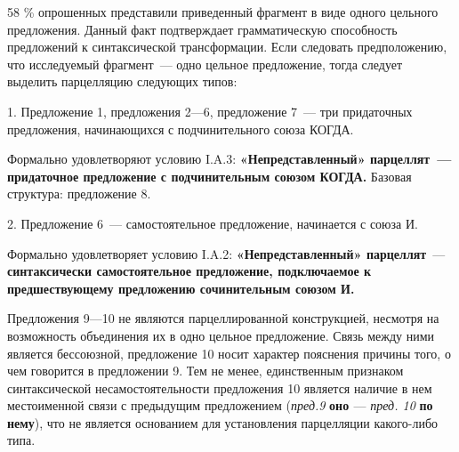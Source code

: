 \documentclass{kursa4}
\begin{document}
    \textcolor[rgb]{0.2,0.2,0.2}{}\textcolor[rgb]{0.2,0.2,0.2}{58 \%
    опрошенных представили приведенный фрагмент в виде
    }\textcolor[rgb]{0.2,0.2,0.2}{одного цельного
    предложения}\textcolor[rgb]{0.2,0.2,0.2}{. Данный факт подтверждает
    грамматическую способность предложений к синтаксической трансформации.
    }\textcolor[rgb]{0.2,0.2,0.2}{Если следовать предположению, что
    исследуемый фрагмент~--- одно цельное предложение, тогда следует выделить
    парцелляцию следующих типов: }

    \textcolor[rgb]{0.2,0.2,0.2}{1. Предложение 1, предложения 2—6,
    предложение 7~--- три придаточных предложения, начинающихся с
    подчинительного союза КОГДА.}

    \textcolor[rgb]{0.2,0.2,0.2}{Формально удовлетворяют условию I.A.3:
    }\textbf{\textcolor[rgb]{0.2,0.2,0.2}{«Непредставленный» парцеллят~---
    придаточное предложение с подчинительным союзом
    КОГДА.}}\textcolor[rgb]{0.2,0.2,0.2}{ Базовая структура: предложение
    8.}

    \textcolor[rgb]{0.2,0.2,0.2}{2. Предложение
    }\textcolor[rgb]{0.2,0.2,0.2}{6}\textcolor[rgb]{0.2,0.2,0.2}{~---
    }\textcolor[rgb]{0.2,0.2,0.2}{самостоятельное предложение, начинается с
    союза }\textcolor[rgb]{0.2,0.2,0.2}{И.}

    \textcolor[rgb]{0.2,0.2,0.2}{Ф}\textcolor[rgb]{0.2,0.2,0.2}{ормально
    удовлетворяет условию I.A.2:
    }\textbf{\textcolor[rgb]{0.2,0.2,0.2}{«Непредставленный»
    парцеллят}}\textcolor[rgb]{0.2,0.2,0.2}{~---
    }\textbf{\textcolor[rgb]{0.2,0.2,0.2}{синтаксически самостоятельное
    предложение, подключаемое к предшествующему предложению сочинительным
    союзом И.}}

    \textcolor[rgb]{0.2,0.2,0.2}{Предложения 9—10 не являются
    парцеллированной конструкцией, несмотря на возможность объединения их в
    одно цельное предложение. Связь между ними является бессоюзной,
    предложение 10 носит характер пояснения причины того, о чем говорится в
    предложении 9. Тем не менее, единственным признаком синтаксической
    несамостоятельности предложения 10 является наличие в нем местоименной
    связи с предыдущим предложением
    (}\textit{\textcolor[rgb]{0.2,0.2,0.2}{пред.9}}\textcolor[rgb]{0.2,0.2,0.2}{
    }\textbf{\textcolor[rgb]{0.2,0.2,0.2}{оно}}\textbf{\textcolor[rgb]{0.2,0.2,0.2}{
    }}\textcolor[rgb]{0.2,0.2,0.2}{—
    }\textit{\textcolor[rgb]{0.2,0.2,0.2}{пред.
    10}}\textcolor[rgb]{0.2,0.2,0.2}{
    }\textbf{\textcolor[rgb]{0.2,0.2,0.2}{по
    нему}}\textcolor[rgb]{0.2,0.2,0.2}{), что не является основанием для
    установления парцелляции какого-либо типа.}
\end{document}
